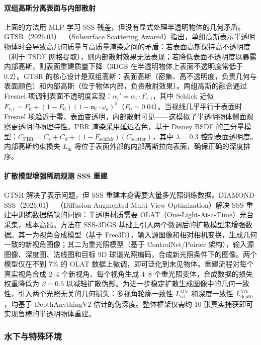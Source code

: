 \paragraph{双组高斯分离表面与内部散射}

上面的方法用 MLP 学习 SSS 残差，但没有显式处理半透明物体的几何矛盾。GTSR（2026.03）~\cite{2603_22036}（Subsurface Scattering Awared）指出，单组高斯表示半透明物体时会导致高几何质量与高质量渲染之间的矛盾：若表面高斯保持高不透明度（利于 TSDF 网格提取），则内部散射效果无法表现；若降低表面不透明度以暴露内部高斯，则表面重建质量下降（3DGS 在半透明物体上表面不透明度常低于 0.2）。GTSR 的核心设计是双组高斯：表面高斯（密集、高不透明度，负责几何与表面颜色）和内部高斯（位于物体内部，负责散射效果）。两组高斯的融合通过 Fresnel 项调制表面不透明度实现：$\alpha_i' = \alpha_i \cdot F_{r,i}$，其中 Schlick 近似 $F_{r,i} = F_0 + (1-F_0)(1-\mathbf{n}_i\cdot\omega_o)^5$（$F_0=0.04$）。当视线几乎平行于表面时 Fresnel 项趋近于零，表面变透明，内部散射可见——这模拟了半透明物体侧面观察更透明的物理特性。PBR 渲染采用延迟着色，基于 Disney BSDF 的三分量模型：$C_{\text{PBR}} = C_s + C_d + (1-F_{\text{schlick}})(C_{\text{scatter}})$，其中 $\lambda=0.3$ 控制表面透明度。内部高斯约束损失 $L_{\text{in}}$ 将位于表面外部的内部高斯拉向表面，确保正确的深度排序。

\paragraph{扩散模型增强稀疏观测 SSS 重建}

GTSR 解决了表示问题，但 SSS 重建本身需要大量多光照训练数据。DIAMOND-SSS（2026.01）~\cite{2601_12020}（Diffusion-Augmented Multi-View Optimization）解决 SSS 重建中训练数据稀缺的问题：半透明材质需要 OLAT（One-Light-At-a-Time）光台采集，成本高昂。方法在 SSS-3DGS 基础上引入两个微调后的扩散模型来增强数据。其一为视角合成模型（基于 Free3D），输入源图像和相对相机变换，生成几何一致的新视角图像；其二为重光照模型（基于 ControlNet/Poirier 架构），输入源图像、深度图、法线图和目标 9D 球谐光照编码，合成新光照条件下的图像。两个模型仅在不到 7\% 的 OLAT 数据上微调，即可泛化到未见物体。重建流程对每个真实视角合成 2--4 个新视角、每个视角生成 4--8 个重光照变体，合成数据的损失权重降低为 $\beta=0.5$ 以减轻扩散伪影。为进一步稳定扩散生成图像中的几何一致性，引入两个光照无关的几何损失：多视角轮廓一致性 $L_{\text{sil}}^{\text{MV}}$ 和深度一致性 $L_{\text{depth}}^{\text{MV}}$，均基于 DepthAnythingV2 估计的伪深度。整体框架仅需约 10 张真实捕获即可实现鲁棒的半透明物体重建。

\subsubsection{水下与特殊环境}

